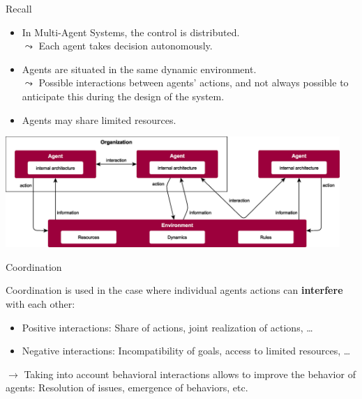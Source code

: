 \documentclass[9pt]{beamer}
\begin{document}
\begin{frame}[noframenumbering]{Recall}
\begin{small}
\begin{itemize}
\item In Multi-Agent Systems, \textcolor{CS-1light}{the control is distributed}.\\
$\leadsto$ Each agent takes decision \textcolor{CS-1light}{autonomously}. 
\item Agents are situated in the same dynamic environment.\\ 
$\leadsto$ Possible \textcolor{CS-1light}{interactions} between agents' actions, and not always possible \textcolor{CS-1light}{to anticipate} this during the design of the system. 
\item Agents may share \textcolor{CS-1light}{limited resources}. 
\end{itemize}

\begin{center}
\includegraphics[keepaspectratio,width=0.95\textwidth]{images/mabs_details.eps}
\end{center}

\end{small}
\end{frame}

\begin{frame}[noframenumbering]{Coordination}
\begin{small}

Coordination is used in the case where individual agents actions can \textbf{interfere} with each other:
\begin{itemize}
\item \textcolor{CS-1light}{Positive interactions}: Share of actions, joint realization of actions, \dots
\item \textcolor{CS-1light}{Negative interactions}: Incompatibility of goals, access to limited resources, \dots
\end{itemize}

$\rightarrow$ Taking into account behavioral interactions allows to improve the behavior of agents: Resolution of issues, emergence of behaviors, etc. 

\end{small}
\end{frame}
\end{document}

